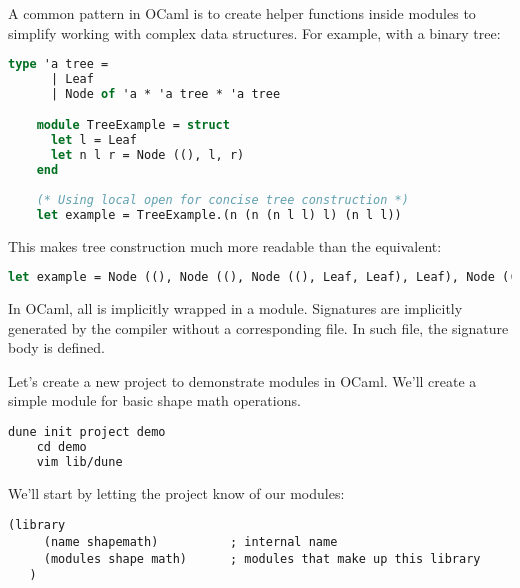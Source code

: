 \begin{Def}
    
    A common pattern in OCaml is to create helper functions inside modules to simplify working with complex data structures. For example, with a binary tree:
    
    \begin{lstlisting}[language=OCaml, numbers=none]
    type 'a tree =
      | Leaf
      | Node of 'a * 'a tree * 'a tree

    module TreeExample = struct
      let l = Leaf
      let n l r = Node ((), l, r)
    end
    
    (* Using local open for concise tree construction *)
    let example = TreeExample.(n (n (n l l) l) (n l l))
    \end{lstlisting}
    
    \noindent
    This makes tree construction much more readable than the equivalent:
    \begin{lstlisting}[language=OCaml, numbers=none]
    let example = Node ((), Node ((), Node ((), Leaf, Leaf), Leaf), Node ((), Leaf, Leaf))
    \end{lstlisting}
\end{Def}


\begin{Def}

  In OCaml, all  is implicitly wrapped in a module. Signatures are implicitly generated by the compiler without a corresponding  file.
  In such file, the signature body is defined.
\end{Def}

\vspace{-1em}
\begin{Example}

  Let's create a new project to demonstrate modules in OCaml. We'll create a simple module for basic shape math operations.
  \begin{lstlisting}[language=OCaml, numbers=none]
    dune init project demo 
    cd demo 
    vim lib/dune
\end{lstlisting}
We'll start by letting the project know of our modules:
\begin{lstlisting}[numbers=none]
   (library
     (name shapemath)          ; internal name
     (modules shape math)      ; modules that make up this library
   )
\end{lstlisting}
\end{Example}


